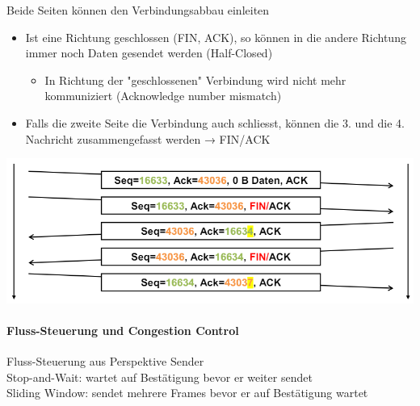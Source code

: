 \begin{example}
    Beide Seiten können den Verbindungsabbau einleiten
    \begin{itemize}
        \item Ist eine Richtung geschlossen (FIN, ACK), so können in die andere Richtung immer noch Daten gesendet werden (Half-Closed)
        \begin{itemize}
            \item In Richtung der "geschlossenen" Verbindung wird nicht mehr kommuniziert (Acknowledge number mismatch)
        \end{itemize}
        \item Falls die zweite Seite die Verbindung auch schliesst, können die 3. und die 4. Nachricht zusammengefasst werden → FIN/ACK
    \end{itemize}
        \includegraphics[width=1\linewidth]{images/tcp_verbindungsabbau_ex.png}
\end{example}







\paragraph*{Fluss-Steuerung und Congestion Control}



\begin{concept}{Fluss-Steuerung} aus Perspektive Sender\\
    Stop-and-Wait: wartet auf Bestätigung bevor er weiter sendet\\
    Sliding Window: sendet mehrere Frames bevor er auf Bestätigung wartet
\end{concept}

